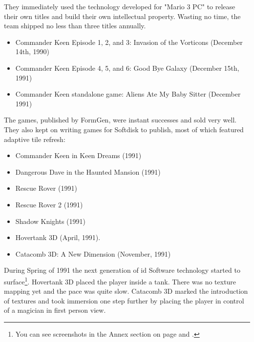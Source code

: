 \documentclass[book.tex]{subfiles}
\begin{document}
They immediately used the technology developed for "Mario 3 PC" to release their own titles and build their own intellectual property. Wasting no time, the team shipped no less than three titles annually.
\begin{itemize}
    \item Commander Keen Episode 1, 2, and 3: Invasion of the Vorticons (December 14th, 1990)
    \item Commander Keen Episode 4, 5, and 6: Good Bye Galaxy (December 15th, 1991)
    \item Commander Keen standalone game: Aliens Ate My Baby Sitter (December 1991)
\end{itemize}
The games, published by FormGen, were instant successes and sold very well. They also kept on writing games for Softdisk to publish, most of which featured adaptive tile refresh:
\begin{itemize}
  \item Commander Keen in Keen Dreams (1991)
  \item Dangerous Dave in the Haunted Mansion (1991)
  \item Rescue Rover (1991)
  \item Rescue Rover 2 (1991)
  \item Shadow Knights (1991)
  \item Hovertank 3D (April, 1991).
  \item Catacomb 3D: A New Dimension (November, 1991)
\end{itemize}
During Spring of 1991 the next generation of id Software technology started to surface\footnote{You can see screenshots in the Annex section on page \pageref{hovertank3d_screenshot} and \pageref{catacomb3d_screenshot}.}. Hovertank 3D placed the player inside a tank. There was no texture mapping yet and the pace was quite slow. Catacomb 3D marked the introduction of textures and took immersion one step further by placing the player in control of a magician in first person view. \\
\par
\end{document}
